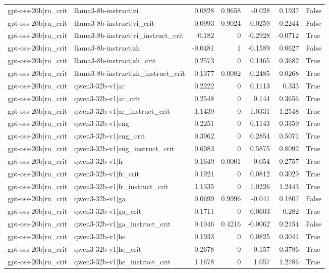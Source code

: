 \begin{table}
\begin{tabular}{l l r r r r l}
gpt-oss-20b|ru_crit & llama3-8b-instruct|vi & 0.0828 & 0.9658 & -0.028 & 0.1937 & False \\
gpt-oss-20b|ru_crit & llama3-8b-instruct|vi_crit & 0.0993 & 0.9024 & -0.0259 & 0.2244 & False \\
gpt-oss-20b|ru_crit & llama3-8b-instruct|vi_instruct_crit & -0.182 & 0 & -0.2928 & -0.0712 & True \\
gpt-oss-20b|ru_crit & llama3-8b-instruct|zh & -0.0481 & 1 & -0.1589 & 0.0627 & False \\
gpt-oss-20b|ru_crit & llama3-8b-instruct|zh_crit & 0.2573 & 0 & 0.1465 & 0.3682 & True \\
gpt-oss-20b|ru_crit & llama3-8b-instruct|zh_instruct_crit & -0.1377 & 0.0082 & -0.2485 & -0.0268 & True \\
gpt-oss-20b|ru_crit & qwen3-32b-v1|ar & 0.2222 & 0 & 0.1113 & 0.333 & True \\
gpt-oss-20b|ru_crit & qwen3-32b-v1|ar_crit & 0.2548 & 0 & 0.144 & 0.3656 & True \\
gpt-oss-20b|ru_crit & qwen3-32b-v1|ar_instruct_crit & 1.1439 & 0 & 1.0331 & 1.2548 & True \\
gpt-oss-20b|ru_crit & qwen3-32b-v1|eng & 0.2251 & 0 & 0.1143 & 0.3359 & True \\
gpt-oss-20b|ru_crit & qwen3-32b-v1|eng_crit & 0.3962 & 0 & 0.2854 & 0.5071 & True \\
gpt-oss-20b|ru_crit & qwen3-32b-v1|eng_instruct_crit & 0.6983 & 0 & 0.5875 & 0.8092 & True \\
gpt-oss-20b|ru_crit & qwen3-32b-v1|fr & 0.1649 & 0.0001 & 0.054 & 0.2757 & True \\
gpt-oss-20b|ru_crit & qwen3-32b-v1|fr_crit & 0.1921 & 0 & 0.0812 & 0.3029 & True \\
gpt-oss-20b|ru_crit & qwen3-32b-v1|fr_instruct_crit & 1.1335 & 0 & 1.0226 & 1.2443 & True \\
gpt-oss-20b|ru_crit & qwen3-32b-v1|ga & 0.0699 & 0.9996 & -0.041 & 0.1807 & False \\
gpt-oss-20b|ru_crit & qwen3-32b-v1|ga_crit & 0.1711 & 0 & 0.0603 & 0.282 & True \\
gpt-oss-20b|ru_crit & qwen3-32b-v1|ga_instruct_crit & 0.1046 & 0.4216 & -0.0062 & 0.2154 & False \\
gpt-oss-20b|ru_crit & qwen3-32b-v1|he & 0.1933 & 0 & 0.0825 & 0.3041 & True \\
gpt-oss-20b|ru_crit & qwen3-32b-v1|he_crit & 0.2678 & 0 & 0.157 & 0.3786 & True \\
gpt-oss-20b|ru_crit & qwen3-32b-v1|he_instruct_crit & 1.1678 & 0 & 1.057 & 1.2786 & True \\

\end{tabular}
\end{table}
